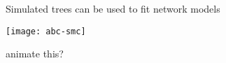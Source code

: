 \begin{frame}{Simulated trees can be used to fit network models}
  \centerline{\texttt{[image: abc-smc]}}

  \centerline{animate this?}
\end{frame}
